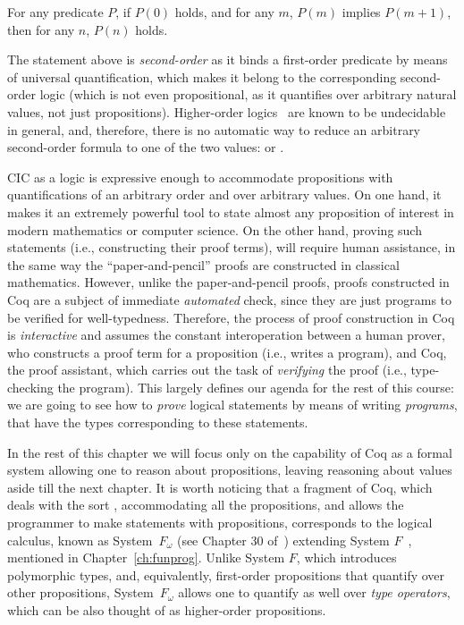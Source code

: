 \begin{center}
For any predicate $P$, if $P(0)$ holds, and for any $m$, $P(m)$
implies $P(m + 1)$, \\
then for any $n$, $P(n)$ holds.
\end{center}



The statement above is \textit{second-order} as it binds a first-order
predicate by means of universal quantification, which makes it belong
to the corresponding second-order logic (which is not even
propositional, as it quantifies over arbitrary natural values, not
just propositions). Higher-order logics~\cite{Church:JSL40} are
known to be undecidable in general, and, therefore, there is no
automatic way to reduce an arbitrary second-order formula to one of
the two values:  or .


CIC as a logic is expressive enough to accommodate propositions with
quantifications of an arbitrary order and over arbitrary values. On
one hand, it makes it an extremely powerful tool to state almost any
proposition of interest in modern mathematics or computer science. On
the other hand, proving such statements (i.e., constructing their
proof terms), will require human assistance, in the same way the
``paper-and-pencil'' proofs are constructed in classical
mathematics. However, unlike the paper-and-pencil proofs, proofs
constructed in Coq are a subject of immediate \textit{automated} check, since
they are just programs to be verified for well-typedness. Therefore,
the process of proof construction in Coq is \textit{interactive} and assumes
the constant interoperation between a human prover, who constructs a
proof term for a proposition (i.e., writes a program), and Coq, the
proof assistant, which carries out the task of \textit{verifying} the proof
(i.e., type-checking the program). This largely defines our agenda for
the rest of this course: we are going to see how to \textit{prove} logical
statements by means of writing \textit{programs}, that have the types
corresponding to these statements.


In the rest of this chapter we will focus only on the capability of
Coq as a formal system allowing one to reason about propositions,
leaving reasoning about values aside till the next chapter. It is
worth noticing that a fragment of Coq, which deals with the sort
, accommodating all the propositions, and allows the programmer
to make statements with propositions, corresponds to the logical
calculus, known as System~$F_{\omega}$
(see Chapter 30 of~\cite{Pierce:BOOK02}) 
extending System $F$~\cite{Reynolds:SP74,Girard:PhD}, mentioned in
Chapter~\ref{ch:funprog}. Unlike System $F$, which introduces
polymorphic types, and, equivalently, first-order propositions that
quantify over other propositions, System~$F_{\omega}$ allows one to
quantify as well over \textit{type operators}, which can be also thought of
as higher-order propositions.


